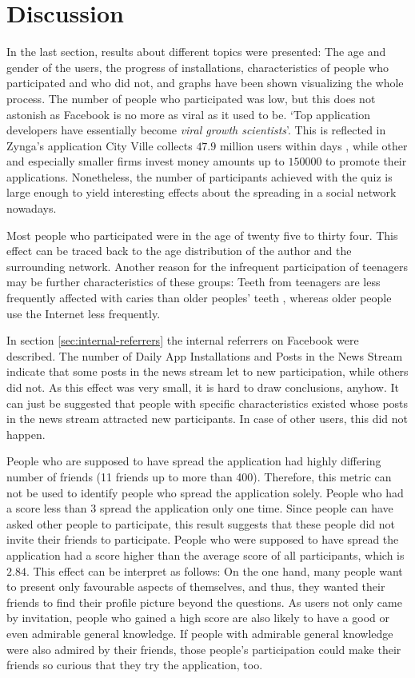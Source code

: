 \documentclass[preprint,12pt]{elsarticle}
\begin{document}
\section{Discussion}
\label{sec:discussion}
In the last section, results about different topics were presented:
The age and gender of the users, the progress of installations,
characteristics of people who participated and who did not, and graphs
have been shown visualizing the whole process. The number of
people who participated was low, but this does not astonish as
Facebook is no more as viral as it used to be. `Top application
developers have essentially become \textit{viral growth scientists}'. \cite{facebookVirality}
This is reflected in Zynga's application City Ville collects
$47.9$ million users within days \cite{cityVille}, while other 
and especially smaller firms invest money
amounts up to $150 000$ \textdollar to promote their
applications\cite{facebookVirality}. 
Nonetheless, the number of 
participants achieved with the quiz is large enough to yield interesting effects about the
spreading in a social network nowadays.

Most people who participated were in the age of twenty five to thirty
four. This effect can be traced back to the age distribution of the
author and the surrounding network. Another reason for the infrequent
participation of teenagers may be further characteristics of these
groups: Teeth from teenagers are less frequently affected with caries than older peoples' teeth
\cite{zahngesundheit}, whereas older people use the Internet less
frequently\cite{internetNutzung}. 

In section \ref{sec:internal-referrers} the internal referrers on
Facebook were described. The number of Daily App Installations and
Posts in the News Stream indicate that some posts in the news stream
let to new participation, while others did not. As this effect was
very small, it is hard to draw conclusions, anyhow. It can just be
suggested that people with specific characteristics existed whose
posts in the news stream attracted new participants. In case of other
users, this did not happen.

People who are supposed to have spread the application had highly differing number of
friends (11 friends up to more than 400). Therefore, this metric can not be used to identify people who
spread the application solely. People who had a score less than 3
spread the application only one time. Since people can have asked
other people to participate, this result suggests that these people
did not invite their friends to participate. People who
were supposed to have spread the application had a score higher than the
average score of all participants, which is $2.84$. This effect can
be interpret as follows: On the one hand, many people want to
present only favourable aspects of themselves, and thus, they wanted
their friends to find their profile picture beyond the questions.
As users not only came by invitation, people who gained a high score
are also likely to have a good or even admirable 
general knowledge. If people with admirable general knowledge were also
admired by their friends, those people's participation could make
their friends so curious that they try the application, too.
\end{document}
